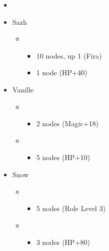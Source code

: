 \begin{menu}
	\begin{itemize}
		\paradigm
		\begin{itemize}
			\item {}%
				  {\paradigmline[4]{\syn}{\med}{\com}}%
			      {\paradigmline{\rav}{(\rav)}{\rav}}%
			      {\paradigmline{\syn}{\med}{(\com)}}%
			      {\paradigmline{\syn}{\sab}{\rav}}%
			      {\paradigmline{\com}{(\rav)}{\com}}%
			      {\paradigmline{(\rav)}{(\rav)}{(\com)}}
		\end{itemize}
		\crystarium
		\begin{itemize}
			\item Sazh
				\begin{itemize}
					\item \rav
				    	\begin{itemize}
					    	\item 10 nodes, up 1 (Fira)
							\item 1 node (HP+40)
				        \end{itemize}
			    \end{itemize}
			\item Vanille
				\begin{itemize}
					\item \med
				    	\begin{itemize}
					    	\item 2 nodes (Magic+18)
				        \end{itemize}
				    \item \rav
				    	\begin{itemize}
				    		\item 5 nodes (HP+10)
				    	\end{itemize}
			    \end{itemize}
			\item Snow
				\begin{itemize}
					\item \rav
						\begin{itemize}
							\item 5 nodes (Role Level 3)
						\end{itemize}
					\item \sen
						\begin{itemize}
							\item 3 nodes (HP+80)
						\end{itemize}
				\end{itemize}
		\end{itemize}

\end{itemize}
\end{menu}
